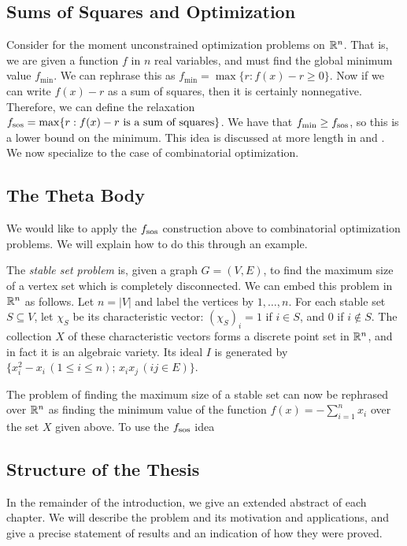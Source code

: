 \subsection{Sums of Squares and Optimization}
Consider for the moment unconstrained optimization problems on $\mathbb{R}^n$. That 
is, we are given a function $f$ in $n$ real variables, and must find the 
global minimum value $f_{\min}$. We can rephrase this as $f_{\min} = 
\max \{r: f(x) - r \ge 0\}$. Now if we can write $f(x) - r$ as a sum of squares,
then it is certainly nonnegative. Therefore, we can define the relaxation
$f_{\textup{sos}} = \max \{r: f(x) - r \textup{ is a sum of squares}\}$.
We have that $f_{\min} \ge f_{\textup{sos}}$, so this is a lower bound on
the minimum. This idea is discussed at more length in \cite{sostools} and 
\cite{lasserre}. We now specialize to the case of combinatorial optimization.

\subsection{The Theta Body}
We would like to apply the $f_{\textup{sos}}$ construction above to
combinatorial optimization problems. We will explain how to do this through
an example.

The {\em stable set problem} is, given a graph $G = (V,E)$, to find the
maximum size of a vertex set which is completely disconnected. We can embed
this problem in $\mathbb{R}^n$ as follows. Let $n = |V|$ and label the vertices by 
$1, \ldots, n$. For each stable set $S \subseteq V$, let $\chi_S$ be its 
characteristic vector: $(\chi_S)_i = 1$ if $i \in S$, and 0 if $i \notin S$.
The collection $X$ of these characteristic vectors forms a discrete point set
in $\mathbb{R}^n$, and in fact it is an algebraic variety. Its ideal
$I$ is generated by $\{x_i^2 - x_i \, (1\le i \le n);\, x_ix_j\, (ij \in E) \}$.

The problem of finding the maximum size of a stable set can now be rephrased
over $\mathbb{R}^n$ as finding the minimum value of the function
$f(x) = - \sum_{i=1}^n x_i$ over the set $X$ given above. To use the
$f_{\textup{sos}}$ idea

\subsection{Structure of the Thesis}
In the remainder of the introduction, we give an extended abstract of each
chapter. We will describe the problem and its motivation and applications,
and give a precise statement of results and an indication of how they were 
proved.

